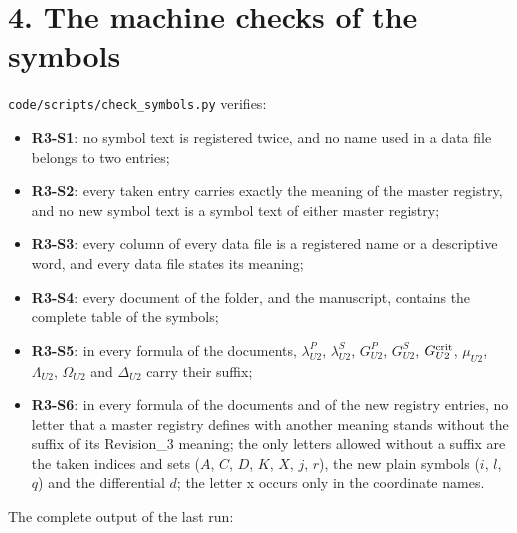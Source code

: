 \documentclass[
  10pt,
]{article}
\providecommand{\tightlist}{%
  \setlength{\itemsep}{0pt}\setlength{\parskip}{0pt}}
\begin{document}
\hypertarget{the-machine-checks-of-the-symbols}{%
\section{4. The machine checks of the
symbols}\label{the-machine-checks-of-the-symbols}}

\texttt{code/scripts/check\_symbols.py} verifies:

\begin{itemize}
\tightlist
\item
  \textbf{R3-S1}: no symbol text is registered twice, and no name used
  in a data file belongs to two entries;
\item
  \textbf{R3-S2}: every taken entry carries exactly the meaning of the
  master registry, and no new symbol text is a symbol text of either
  master registry;
\item
  \textbf{R3-S3}: every column of every data file is a registered name
  or a descriptive word, and every data file states its meaning;
\item
  \textbf{R3-S4}: every document of the folder, and the manuscript,
  contains the complete table of the symbols;
\item
  \textbf{R3-S5}: in every formula of the documents, \(\lambda^P_{U2}\),
  \(\lambda^S_{U2}\), \(G^P_{U2}\), \(G^S_{U2}\), \(G^{\rm crit}_{U2}\),
  \(\mu_{U2}\), \(\Lambda_{U2}\), \(\Omega_{U2}\) and \(\Delta_{U2}\)
  carry their suffix;
\item
  \textbf{R3-S6}: in every formula of the documents and of the new
  registry entries, no letter that a master registry defines with
  another meaning stands without the suffix of its Revision\_3 meaning;
  the only letters allowed without a suffix are the taken indices and
  sets (\(A\), \(C\), \(D\), \(K\), \(X\), \(j\), \(r\)), the new plain
  symbols (\(i\), \(l\), \(q\)) and the differential \(d\); the letter x
  occurs only in the coordinate names.
\end{itemize}

The complete output of the last run:
\end{document}
